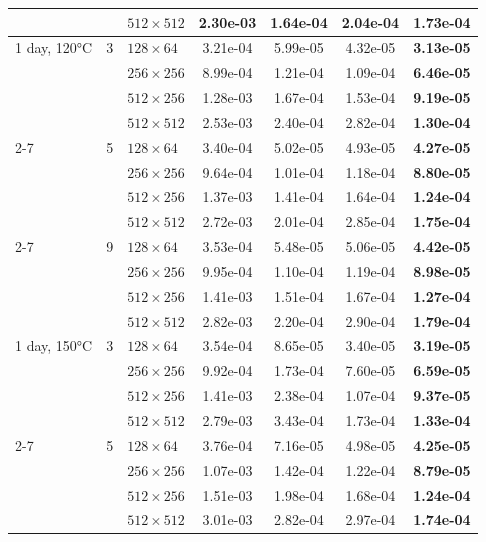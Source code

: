 \begin{table}[htb]
\begin{tabular}{l l l  c c c c}
     &  & $512\times512$ & 2.30e-03 & \textbf{1.64e-04} & 2.04e-04 & 1.73e-04 \\
    \midrule
    1 day, 120°C & 3 & $128\times64$ & 3.21e-04 & 5.99e-05 & 4.32e-05 & \textbf{3.13e-05} \\
     &  & $256\times256$ & 8.99e-04 & 1.21e-04 & 1.09e-04 & \textbf{6.46e-05} \\
     &  & $512\times256$ & 1.28e-03 & 1.67e-04 & 1.53e-04 & \textbf{9.19e-05} \\
     &  & $512\times512$ & 2.53e-03 & 2.40e-04 & 2.82e-04 & \textbf{1.30e-04} \\
    \cmidrule(lr){2-7}
     & 5 & $128\times64$ & 3.40e-04 & 5.02e-05 & 4.93e-05 & \textbf{4.27e-05} \\
     &  & $256\times256$ & 9.64e-04 & 1.01e-04 & 1.18e-04 & \textbf{8.80e-05} \\
     &  & $512\times256$ & 1.37e-03 & 1.41e-04 & 1.64e-04 & \textbf{1.24e-04} \\
     &  & $512\times512$ & 2.72e-03 & 2.01e-04 & 2.85e-04 & \textbf{1.75e-04} \\
    \cmidrule(lr){2-7}
     & 9 & $128\times64$ & 3.53e-04 & 5.48e-05 & 5.06e-05 & \textbf{4.42e-05} \\
     &  & $256\times256$ & 9.95e-04 & 1.10e-04 & 1.19e-04 & \textbf{8.98e-05} \\
     &  & $512\times256$ & 1.41e-03 & 1.51e-04 & 1.67e-04 & \textbf{1.27e-04} \\
     &  & $512\times512$ & 2.82e-03 & 2.20e-04 & 2.90e-04 & \textbf{1.79e-04} \\
    \midrule
    1 day, 150°C & 3 & $128\times64$ & 3.54e-04 & 8.65e-05 & 3.40e-05 & \textbf{3.19e-05} \\
     &  & $256\times256$ & 9.92e-04 & 1.73e-04 & 7.60e-05 & \textbf{6.59e-05} \\
     &  & $512\times256$ & 1.41e-03 & 2.38e-04 & 1.07e-04 & \textbf{9.37e-05} \\
     &  & $512\times512$ & 2.79e-03 & 3.43e-04 & 1.73e-04 & \textbf{1.33e-04} \\
    \cmidrule(lr){2-7}
     & 5 & $128\times64$ & 3.76e-04 & 7.16e-05 & 4.98e-05 & \textbf{4.25e-05} \\
     &  & $256\times256$ & 1.07e-03 & 1.42e-04 & 1.22e-04 & \textbf{8.79e-05} \\
     &  & $512\times256$ & 1.51e-03 & 1.98e-04 & 1.68e-04 & \textbf{1.24e-04} \\
     &  & $512\times512$ & 3.01e-03 & 2.82e-04 & 2.97e-04 & \textbf{1.74e-04} \\

\end{tabular}
\end{table}

